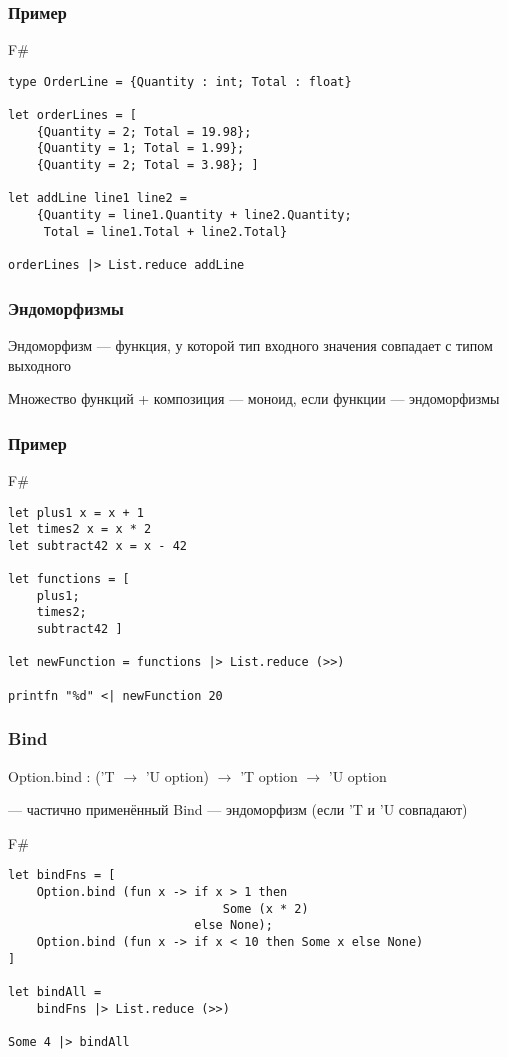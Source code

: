 \documentclass[xetex,mathserif,serif]{beamer}
\begin{document}
	\begin{frame}[fragile]
		\frametitle{Пример}
   		\begin{exampleblock}{F\#}
   			\begin{lstlisting}
type OrderLine = {Quantity : int; Total : float}

let orderLines = [
    {Quantity = 2; Total = 19.98};
    {Quantity = 1; Total = 1.99};
    {Quantity = 2; Total = 3.98}; ]
    
let addLine line1 line2 =
    {Quantity = line1.Quantity + line2.Quantity; 
     Total = line1.Total + line2.Total}
     
orderLines |> List.reduce addLine
\end{lstlisting}
\end{exampleblock}
\end{frame}

	\begin{frame}
		\frametitle{Эндоморфизмы}
		Эндоморфизм --- функция, у которой тип входного значения совпадает с типом выходного
		
		\vspace{1cm}
		Множество функций + композиция --- моноид, если функции --- эндоморфизмы
    \end{frame}

	\begin{frame}[fragile]
		\frametitle{Пример}
   		\begin{exampleblock}{F\#}
   			\begin{lstlisting}
let plus1 x = x + 1
let times2 x = x * 2
let subtract42 x = x - 42

let functions = [
    plus1;
    times2;
    subtract42 ]
    
let newFunction = functions |> List.reduce (>>)

printfn "%d" <| newFunction 20
\end{lstlisting}
\end{exampleblock}
\end{frame}

	\begin{frame}[fragile]
		\frametitle{Bind}
		Option.bind : ('T $\to$ 'U option) $\to$ 'T option $\to$ 'U option

		--- частично применённый Bind --- эндоморфизм (если 'T и 'U совпадают)
   		\begin{exampleblock}{F\#}
   			\begin{lstlisting}
let bindFns = [
    Option.bind (fun x -> if x > 1 then 
                              Some (x * 2) 
                          else None);
    Option.bind (fun x -> if x < 10 then Some x else None)
]

let bindAll = 
    bindFns |> List.reduce (>>)
    
Some 4 |> bindAll
\end{lstlisting}
\end{exampleblock}
\end{frame}
\end{document}
